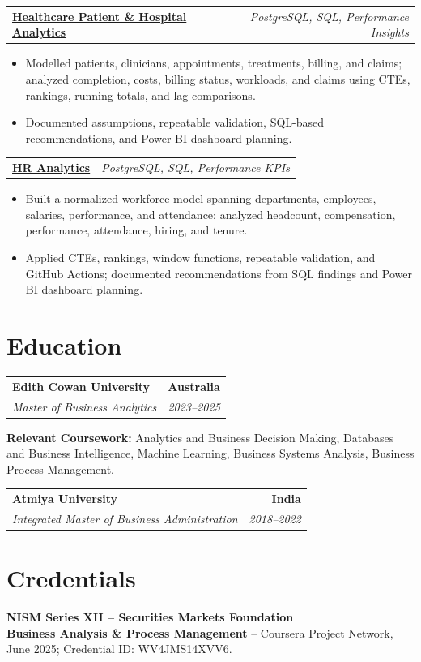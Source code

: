 \documentclass[letterpaper,10pt]{article}
\makeatletter
\newcommand{\role}[4]{%
  \begin{tabularx}{\textwidth}{@{}Xr@{}}
    \textbf{#1} & \textbf{#2} \\
    \textit{#3} & \textit{#4}
  \end{tabularx}\vspace{-1pt}
}
\newcommand{\project}[2]{%
  \begin{tabularx}{\textwidth}{@{}Xr@{}}
    \textbf{#1} & \textit{#2}
  \end{tabularx}\vspace{-1pt}
}
\makeatother
\begin{document}
\project{\href{https://github.com/jainalimehta/Healthcare-Analytics}{Healthcare Patient \& Hospital Analytics}}{PostgreSQL, SQL, Performance Insights}
\begin{itemize}
  \item Modelled patients, clinicians, appointments, treatments, billing, and claims; analyzed completion, costs, billing status, workloads, and claims using CTEs, rankings, running totals, and lag comparisons.
  \item Documented assumptions, repeatable validation, SQL-based recommendations, and Power BI dashboard planning.
\end{itemize}
\vspace{1pt}

\project{\href{https://github.com/jainalimehta/HR-Analytics}{HR Analytics}}{PostgreSQL, SQL, Performance KPIs}
\begin{itemize}
  \item Built a normalized workforce model spanning departments, employees, salaries, performance, and attendance; analyzed headcount, compensation, performance, attendance, hiring, and tenure.
  \item Applied CTEs, rankings, window functions, repeatable validation, and GitHub Actions; documented recommendations from SQL findings and Power BI dashboard planning.
\end{itemize}

\section{Education}
\role{Edith Cowan University}{Australia}{Master of Business Analytics}{2023--2025}
\small\textbf{Relevant Coursework:} Analytics and Business Decision Making, Databases and Business Intelligence, Machine Learning, Business Systems Analysis, Business Process Management.\\[2pt]
\role{Atmiya University}{India}{Integrated Master of Business Administration}{2018--2022}

\section{Credentials}
\small\textbf{NISM Series XII -- Securities Markets Foundation}\\[-0.2pt]
\small\textbf{Business Analysis \& Process Management} -- Coursera Project Network, June 2025; Credential ID: WV4JMS14XVV6.
\end{document}

